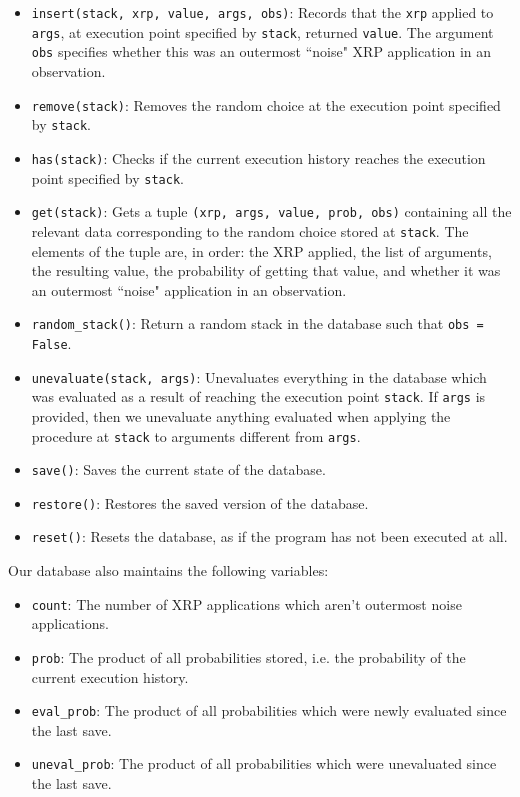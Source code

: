 \documentclass[11pt]{article}
\begin{document}
\begin{itemize}
\item {\tt insert(stack, xrp, value, args, obs)}:  Records that the {\tt xrp} applied to {\tt args}, at execution point specified by {\tt stack}, returned {\tt value}.  The argument {\tt obs} specifies whether this was an outermost ``noise" XRP application in an observation.  
\item {\tt remove(stack)}:  Removes the random choice at the execution point specified by {\tt stack}.  
\item {\tt has(stack)}:  Checks if the current execution history reaches the execution point specified by {\tt stack}.  
\item {\tt get(stack)}:  Gets a tuple {\tt (xrp, args, value, prob, obs)} containing all the relevant data corresponding to the random choice stored at {\tt stack}.  The elements of the tuple are, in order:  the XRP applied, the list of arguments, the resulting value, the probability of getting that value, and whether it was an outermost ``noise" application in an observation.
\item {\tt random\_stack()}:  Return a random stack in the database such that {\tt obs = False}.  
\item {\tt unevaluate(stack, args)}: Unevaluates everything in the database which was evaluated as a result of reaching the execution point {\tt stack}.  If {\tt args} is provided, then we unevaluate anything evaluated when applying the procedure at {\tt stack} to arguments different from {\tt args}.
\item {\tt save()}: Saves the current state of the database.
\item {\tt restore()}: Restores the saved version of the database.
\item {\tt reset()}: Resets the database, as if the program has not been executed at all.  
\end{itemize}
Our database also maintains the following variables:
\begin{itemize}
\item {\tt count}:  The number of XRP applications which aren't outermost noise applications.
\item {\tt prob}:  The product of all probabilities stored, i.e. the probability of the current execution history.
\item {\tt eval\_prob}:  The product of all probabilities which were newly evaluated since the last save.
\item {\tt uneval\_prob}:  The product of all probabilities which were unevaluated since the last save.
\end{itemize}
\end{document}

